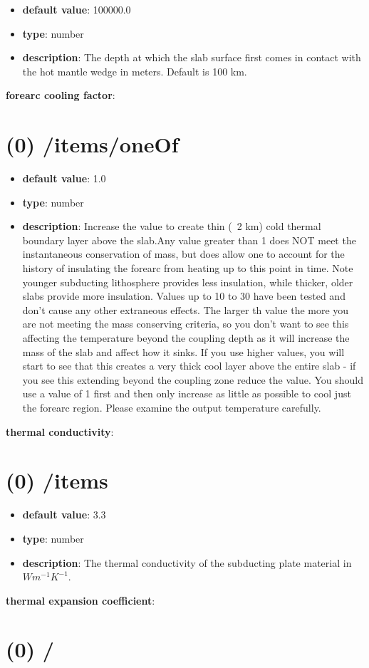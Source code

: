 \begin{itemize}[leftmargin=1em]\item {\bf default value}: 100000.0
\item {\bf type}: number
\item {\bf description}: The depth at which the slab surface first comes in contact with the hot mantle wedge in meters. Default is 100 km.
\end{itemize}\item {\bf forearc cooling factor}: \section{(0) /items/oneOf}
\begin{itemize}[leftmargin=0em]\item {\bf default value}: 1.0
\item {\bf type}: number
\item {\bf description}: Increase the value to create thin (~2 km) cold thermal boundary layer above the slab.Any value greater than 1 does NOT meet the instantaneous conservation of mass, but does allow one to account for the history of insulating the forearc from heating up to this point in time. Note younger subducting lithosphere provides less insulation, while thicker, older slabs provide more insulation. Values up to 10 to 30 have been tested and don't cause any other extraneous effects. The larger th value the more you are not meeting the mass conserving criteria, so you don't want to see this affecting the temperature beyond the coupling depth as it will increase the mass of the slab and affect how it sinks.  If you use higher values, you will start to see that this creates a very thick cool layer above the entire slab - if you see this extending beyond the coupling zone reduce the value. You should use a value of 1 first and then only increase as little as possible to cool just the forearc region. Please examine the output temperature carefully. 
\end{itemize}\item {\bf thermal conductivity}: \section{(0) /items}
\begin{itemize}[leftmargin=0em]\item {\bf default value}: 3.3
\item {\bf type}: number
\item {\bf description}: The thermal conductivity of the subducting plate material in $W m^{-1} K^{-1}$.
\end{itemize}\item {\bf thermal expansion coefficient}: \section{(0) /}

